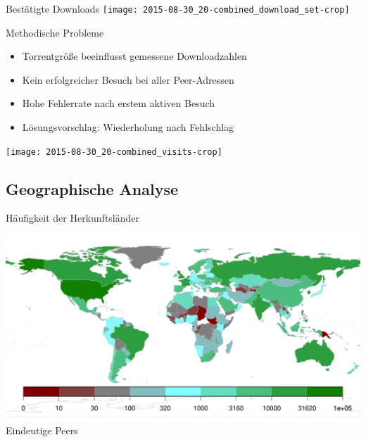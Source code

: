 \documentclass[dvipsnames]{beamer} %
\begin{document}
	\begin{frame}{Bestätigte Downloads}
    \texttt{[image: 2015-08-30\_20-combined\_download\_set-crop]}
	\end{frame}

	\begin{frame}{Methodische Probleme}
		\begin{itemize}
			\item Torrentgröße beeinflusst gemessene Downloadzahlen
			\item Kein erfolgreicher Besuch bei  aller Peer-Adressen
			\item Hohe \alert{Fehlerrate} nach erstem aktiven Besuch
			\item Lösungsvorschlag: \alert{Wiederholung} nach Fehlschlag
		\end{itemize}

		\vspace{0.5cm}
    \texttt{[image: 2015-08-30\_20-combined\_visits-crop]}
	\end{frame}

	\subsection{Geographische Analyse}
	\begin{frame}{Häufigkeit der Herkunftsländer}
		\begin{center}
	    \includegraphics[width=\textwidth]{../result/2015-08-30_20-combined_location_map}\\
	    {\small Eindeutige Peers}
	  \end{center}
	\end{frame}
\end{document}
